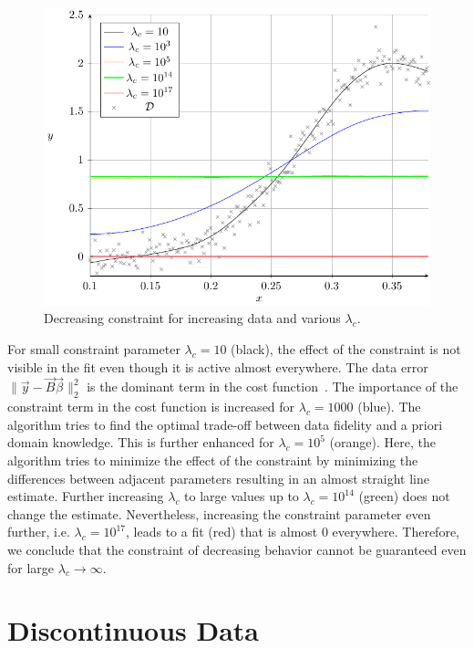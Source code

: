 \begin{figure}[H]
	\centering
	\includegraphics{graphics/pgfplots/cha4/exp-wrongBehav.pdf}
	\caption{Decreasing constraint for increasing data and various $\lambda_c$.}
	\label{fig:example-wrongBehav}
\end{figure}
%
For small constraint parameter $\lambda_c = 10$ (black), the effect of the constraint is not visible in the fit even though it is active almost everywhere. The data error $\lVert \vec{y} - \vec{B} \vec{\beta} \rVert^2_2$ is the dominant term in the cost function~. The importance of the constraint term in the cost function is increased for $\lambda_c = 1000$ (blue). The algorithm tries to find the optimal trade-off between data fidelity and a priori domain knowledge. This is further enhanced for $\lambda_c = 10^5$ (orange). Here, the algorithm tries to minimize the effect of the constraint by minimizing the differences between adjacent parameters resulting in an almost straight line estimate. Further increasing $\lambda_c$ to large values up to $\lambda_c = 10^{14}$ (green) does not change the estimate. Nevertheless, increasing the constraint parameter even further, i.e. $\lambda_c = 10^{17}$, leads to a fit (red) that is almost 0 everywhere. Therefore, we conclude that the constraint of decreasing behavior cannot be guaranteed even for large $\lambda_c \rightarrow \infty$. 

\section{Discontinuous Data} \label{sec:heaviside}

